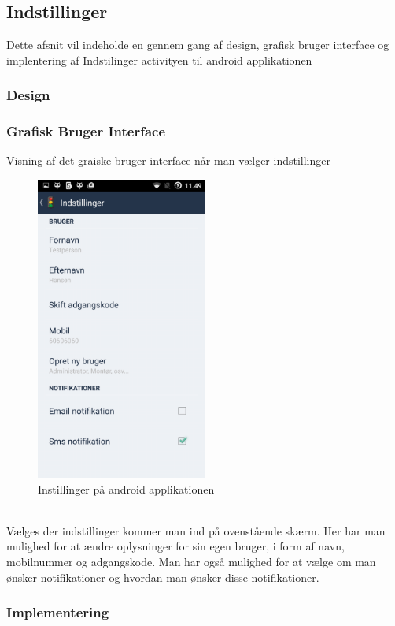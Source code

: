 	\subsection{Indstillinger}
	Dette afsnit vil indeholde en gennem gang af design, grafisk bruger interface og implentering af Indstilinger activityen til android applikationen
	
	\subsubsection{Design}
	
	\subsubsection{Grafisk Bruger Interface}	
	Visning af det graiske bruger interface når man vælger indstillinger
	\begin{figure} [!ht]
		\begin{center}
			\includegraphics[height=10cm]{Android/Billeder/AndroidInstillinger}
		\end{center}
		\caption{Instillinger på android applikationen}
		\label{fig:Instillinger på android applikationen}
	\end{figure} \\
	Vælges der indstillinger kommer man ind på ovenstående skærm. Her har man mulighed for at ændre oplysninger for sin egen bruger, i form af navn, mobilnummer og adgangskode. Man har også mulighed for at vælge om man ønsker notifikationer og hvordan man ønsker disse notifikationer.
	
	\subsubsection{Implementering}
	
	\pagebreak